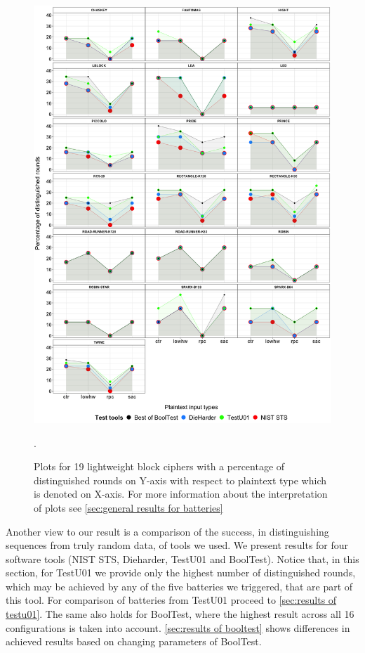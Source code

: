 \documentclass[
    digital,    %
    oneside,    %
    color,
    11pt,
    nocover,
    notable,
    nolof,
    nolot,
    final
]{fithesis3}
\renewcommand\_{\textunderscore\allowbreak}
\begin{document}
\begin{figure}[htbp]
	\centering
	\includegraphics[width=\textwidth]{./images/pictures/batteries_first_part_results.png}
	\caption{Plots for 19 lightweight block ciphers with a percentage of distinguished rounds on Y-axis with respect to plaintext type which is denoted on X-axis. For more information about the interpretation of plots see \cref{sec:general results for batteries}}.
	\label{fig:batteries comparison 1}
\end{figure}

Another view to our result is a comparison of the success, in distinguishing sequences from truly random data, of tools we used. We present results for four software tools (NIST STS, Dieharder, TestU01 and BoolTest). Notice that, in this section, for TestU01 we provide only the highest number of distinguished rounds, which may be achieved by any of the five batteries we triggered, that are part of this tool. For comparison of batteries from TestU01 proceed to \cref{sec:results of testu01}. The same also holds for BoolTest, where the highest result across all 16 configurations is taken into account. \cref{sec:results of booltest} shows differences in achieved results based on changing parameters of BoolTest.
\end{document}

